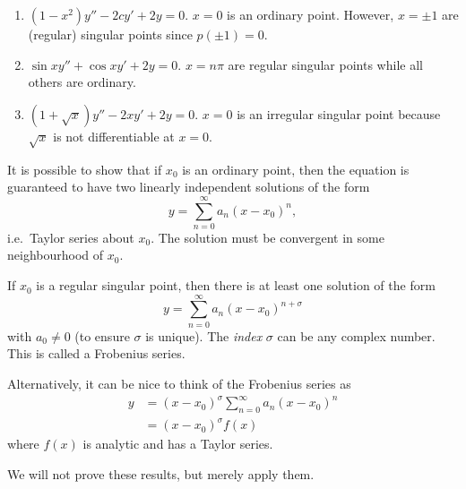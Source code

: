 \documentclass[a4paper]{article}
\begin{document}
\begin{eg}\leavevmode
  \begin{enumerate}
    \item $(1 - x^2)y'' - 2cy' + 2y = 0$. $x = 0$ is an ordinary point. However, $x = \pm 1$ are (regular) singular points since $p(\pm 1) = 0$.
    \item $\sin x y'' + \cos x y' + 2y = 0$. $x = n\pi$ are regular singular points while all others are ordinary.
    \item $(1 + \sqrt{x}) y'' - 2xy' + 2y = 0$. $x = 0$ is an irregular singular point because $\sqrt{x}$ is not differentiable at $x = 0$.
  \end{enumerate}
\end{eg}

It is possible to show that if $x_0$ is an ordinary point, then the equation is guaranteed to have two linearly independent solutions of the form
\[
  y = \sum_{n = 0}^\infty a_n(x - x_0)^n,
\]
i.e.\ Taylor series about $x_0$. The solution must be convergent in some neighbourhood of $x_0$.

If $x_0$ is a regular singular point, then there is at least one solution of the form
\[
  y = \sum_{n = 0}^\infty a_n(x - x_0)^{n + \sigma}
\]
with $a_0 \not= 0$ (to ensure $\sigma$ is unique). The \emph{index} $\sigma$ can be any complex number. This is called a Frobenius series.

Alternatively, it can be nice to think of the Frobenius series as
\begin{align*}
  y &= (x - x_0)^\sigma \sum_{n = 0}^\infty a_n (x - x_0)^n\\
  &= (x-x_0)^\sigma f(x)
\end{align*}
where $f(x)$ is analytic and has a Taylor series.

We will not prove these results, but merely apply them.
\end{document}

